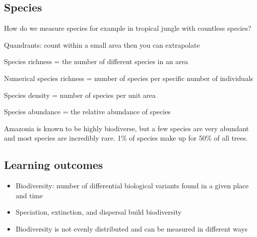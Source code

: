 \subsection{Species}

How do we measure species for example in tropical jungle with countless
species?

Quandrants: count within a small area then you can extrapolate

Species richness = the number of different species in an area

Numerical species richness = number of species per specific number of
individuals

Species density = number of species per unit area

Species abundance = the relative abundance of species

Amazonia is known to be highly biodiverse, but a few species are very abundant
and most species are incredibly rare. 1\% of species make up for 50\% of all
trees.

\subsection{Learning outcomes}
\begin{itemize}
	\item Biodiversity: number of differential biological variants found in
		a given place and time
	\item Speciation, extinction, and dispersal build biodiversity
	\item Biodiversity is not evenly distributed and can be measured in
		different ways
\end{itemize}

